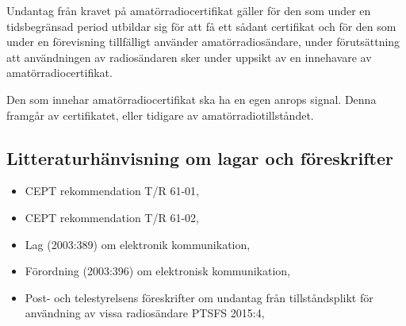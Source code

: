 Undantag från kravet på amatörradiocertifikat gäller för den som under en
tidsbegränsad period utbildar sig för att få ett sådant certifikat och för
den som under en förevisning tillfälligt använder amatörradiosändare, under
förutsättning att användningen av radiosändaren sker under uppsikt av en
innehavare av amatörradiocertifikat.

Den som innehar amatörradiocertifikat ska ha en egen anrops signal.
Denna framgår av certifikatet, eller tidigare av amatörradiotillståndet.

\subsection{Litteraturhänvisning om lagar och föreskrifter}

\begin{itemize}
\item CEPT rekommendation T/R 61-01,
\item CEPT rekommendation T/R 61-02,
\item Lag (2003:389) om elektronik kommunikation,
\item Förordning (2003:396) om elektronisk kommunikation,
\item Post- och telestyrelsens föreskrifter om undantag från tillståndsplikt för
användning av vissa radiosändare PTSFS 2015:4,
\end{itemize}
